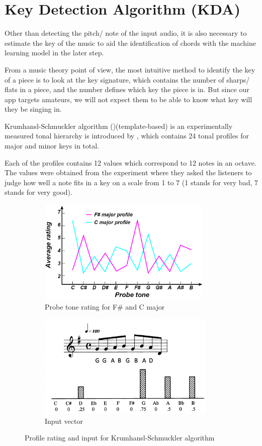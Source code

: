 \section{Key Detection Algorithm (KDA)}
\label{sec:KDA}
Other than detecting the pitch/ note of the input audio, it is also necessary to estimate the key of the music to aid the identification
of chords with the machine learning model in the later step.

From a music theory point of view, the most intuitive method to identify the key of a piece is to look at the key signature, which contains the number of sharps/ flats
in a piece, and the number defines which key the piece is in. But since our app targets amateurs, we will not expect them to be able to know what key will they be singing
in.

Krumhansl-Schmuckler algorithm (\cite{krumhanslbook})(template-based)  is an experimentally measured
tonal hierarchy is introduced by \cite{templatedata}, which contains 24 tonal profiles for major and minor keys in total. 

Each of the profiles contains 12 values which correspond to 12 notes in an octave. The values were obtained from the experiment where they asked the listeners to judge how well
a note fits in a key on a scale from 1 to 7 (1 stands for very bad, 7 stands for very good). 

\begin{figure}
    \centering
    \begin{subfigure}{.45\textwidth}
      \centering
      \includegraphics[width=1\linewidth,height=50mm]{Figures/profiles.png}
      \caption{Probe tone rating for F\# and C major}
      \label{probetone}
    \end{subfigure}%
    \begin{subfigure}{.45\textwidth}
        \centering
        \includegraphics[width=1\linewidth,height=50mm]{Figures/inputvec.png}
        \caption{Input vector}
        \label{inputv}
      \end{subfigure}%
    \caption{Profile rating and input for Krumhansl-Schmuckler algorithm}
\end{figure}

